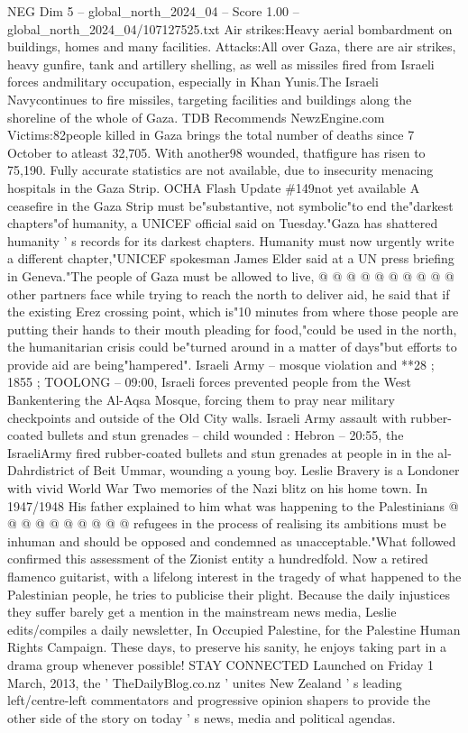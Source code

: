 \begin{textsample}{NEG Dim 5 – global\_north\_2024\_04 – Score 1.00 – global\_north\_2024\_04/107127525.txt}  \label{ex:f5_neg_167}
Air strikes:Heavy aerial bombardment on buildings, homes and many facilities.
Attacks:All over Gaza, there are air strikes, heavy gunfire, tank and artillery shelling, as well as missiles fired from Israeli forces andmilitary occupation, especially in Khan Yunis.The Israeli Navycontinues to fire missiles, targeting facilities and buildings along the shoreline of the whole of Gaza.
TDB Recommends NewzEngine.com Victims:82people killed in Gaza brings the total number of deaths since 7 October to atleast 32,705.
With another98 wounded, thatfigure has risen to 75,190.
Fully accurate statistics are not available, due to insecurity menacing hospitals in the Gaza Strip.
OCHA Flash Update \#149not yet available A ceasefire in the Gaza Strip must be"substantive, not symbolic"to end the"darkest chapters"of humanity, a UNICEF official said on Tuesday."Gaza has shattered humanity ' s records for its darkest chapters.
Humanity must now urgently write a different chapter,"UNICEF spokesman James Elder said at a UN press briefing in Geneva."The people of Gaza must be allowed to live, @ @ @ @ @ @ @ @ @ @ other partners face while trying to reach the north to deliver aid, he said that if the existing Erez crossing point, which is"10 minutes from where those people are putting their hands to their mouth pleading for food,"could be used in the north, the humanitarian crisis could be"turned around in a matter of days"but efforts to provide aid are being"hampered".
Israeli Army -- mosque violation and **28 ; 1855 ; TOOLONG -- 09:00, Israeli forces prevented people from the West Bankentering the Al-Aqsa Mosque, forcing them to pray near military checkpoints and outside of the Old City walls.
Israeli Army assault with rubber-coated bullets and stun grenades -- child wounded : Hebron -- 20:55, the IsraeliArmy fired rubber-coated bullets and stun grenades at people in in the al-Dahrdistrict of Beit Ummar, wounding a young boy.
Leslie Bravery is a Londoner with vivid World War Two memories of the Nazi blitz on his home town.
In 1947/1948 His father explained to him what was happening to the Palestinians @ @ @ @ @ @ @ @ @ @ refugees in the process of realising its ambitions must be inhuman and should be opposed and condemned as unacceptable."What followed confirmed this assessment of the Zionist entity a hundredfold.
Now a retired flamenco guitarist, with a lifelong interest in the tragedy of what happened to the Palestinian people, he tries to publicise their plight.
Because the daily injustices they suffer barely get a mention in the mainstream news media, Leslie edits/compiles a daily newsletter, In Occupied Palestine, for the Palestine Human Rights Campaign.
These days, to preserve his sanity, he enjoys taking part in a drama group whenever possible!
STAY CONNECTED Launched on Friday 1 March, 2013, the ' TheDailyBlog.co.nz ' unites New Zealand ' s leading left/centre-left commentators and progressive opinion shapers to provide the other side of the story on today ' s news, media and political agendas.

\end{textsample}
